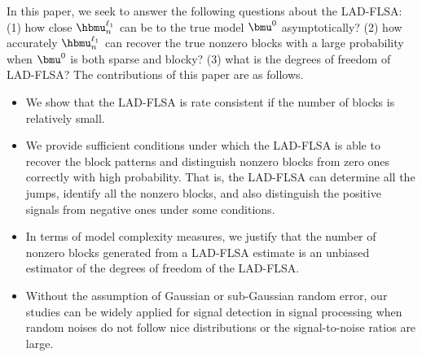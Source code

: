 \documentclass[12pt]{article}
\begin{document}
In this paper, we seek to answer the following questions about
the LAD-FLSA: (1) how  close  $\hbmu_n^{\ell_1}$
can be to the true model $\bmu^0$ asymptotically?
(2) how accurately  $\hbmu_n^{\ell_1}$ can
recover the true nonzero blocks with a large probability when $\bmu^0$ is both sparse and blocky? (3) what is the degrees of freedom of
LAD-FLSA?
The contributions of this paper are as follows.

\begin{itemize}
\item
We show that the LAD-FLSA
is rate consistent if the number of blocks is relatively small.

\item
We provide sufficient conditions under which the LAD-FLSA
is able to recover the block patterns and
distinguish nonzero blocks from zero ones correctly with high probability. That is, the LAD-FLSA can determine all the jumps, identify all the nonzero blocks, and also distinguish the positive signals
from negative ones under some conditions.

\item In terms of model complexity measures, we justify that the number of nonzero blocks generated from
a LAD-FLSA estimate is an unbiased estimator of the degrees of freedom of the LAD-FLSA.

\item Without the assumption of Gaussian or sub-Gaussian random error, our studies can be widely applied for signal detection in signal processing when  random noises  do not follow nice
distributions or the signal-to-noise ratios are large.
\end{itemize}
\end{document}
